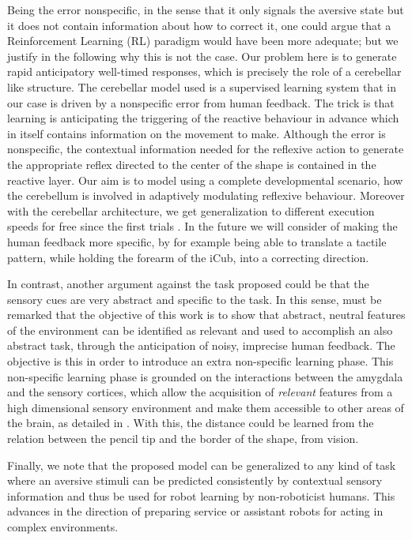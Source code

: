 \documentclass[letterpaper, 10 pt, conference]{ieeeconf}  %
\begin{document}
Being the error nonspecific, in the sense that it only signals the aversive state but it does not contain information about how to correct it, one could argue that a Reinforcement Learning (RL) paradigm would have been more adequate; but we justify in the following why this is not the case. Our problem here is to generate rapid anticipatory well-timed responses, which is precisely the role of a cerebellar like structure.
The cerebellar model used \cite{herreros2013nucleo} is a supervised learning system that in our case is driven by a nonspecific error from human feedback. The trick is that learning is anticipating the triggering of the reactive behaviour in advance which in itself contains information on the movement to make. Although the error is nonspecific, the contextual information needed for the reflexive action to generate the appropriate reflex directed to the center of the shape is contained in the reactive layer. Our aim is to model using a complete developmental scenario, how the cerebellum is involved in adaptively modulating reflexive behaviour. Moreover with the cerebellar architecture, we get generalization to different execution speeds for free since the first trials \cite{herreros2013speed}.  
In the future we will consider of making the human feedback more specific, by for example being able to translate a tactile pattern, while holding the forearm of the iCub, into a correcting direction. 

In contrast, another argument against the task proposed could be that the sensory cues are very abstract and specific to the task. In this sense, must be remarked that the objective of this work is to show that abstract, neutral features of the environment can be identified as relevant and used to accomplish an also abstract task, through the anticipation of noisy, imprecise human feedback. The objective is this in order to introduce an extra non-specific learning phase. This non-specific learning phase is grounded on the interactions between the amygdala and the sensory cortices, which allow the acquisition of \emph{relevant} features from a high dimensional sensory environment and make them accessible to other areas of the brain, as detailed in \cite{puigbo2015}. With this, the distance could be learned from the relation between the pencil tip and the border of the shape, from vision. 

Finally, we note that the proposed model can be generalized to any kind of task where an aversive stimuli can be predicted consistently by contextual sensory information and thus be used for robot learning by non-roboticist humans. This advances in the direction of preparing service or assistant robots for acting in complex environments. 
\end{document}
